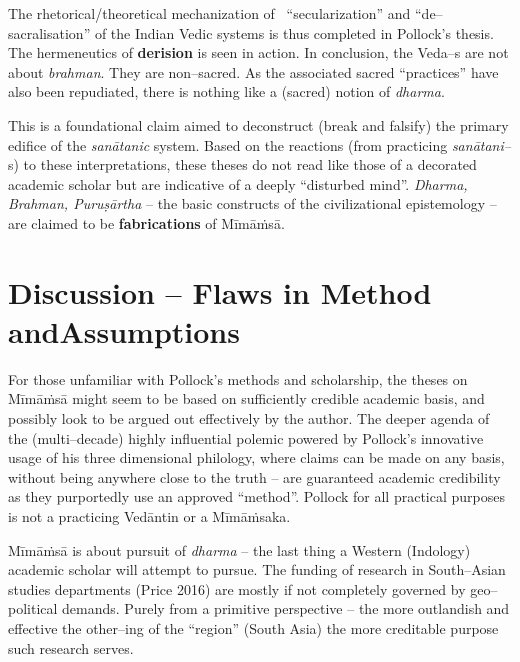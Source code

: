 The rhetorical/theoretical mechanization of  “secularization” and “de–sacralisation” of the Indian Vedic systems is thus completed in Pollock’s thesis. The hermeneutics of \textbf{derision} is seen in action. In conclusion, the Veda–s are not about \textit{brahman}. They are non–sacred. As the associated sacred “practices” have also been repudiated, there is nothing like a (sacred) notion of \textit{dharma}.

This is a foundational claim aimed to deconstruct (break and falsify) the primary edifice of the \textit{sanātanic} system. Based on the reactions (from practicing \textit{sanātani–}s) to these interpretations, these theses do not read like those of a decorated academic scholar but are indicative of a deeply “disturbed mind”. \textit{Dharma, Brahman, Puruṣārtha} – the basic constructs of the civilizational epistemology – are claimed to be \textbf{fabrications} of Mīmāṁsā.


\section*{Discussion – Flaws in Method and\hfill \break Assumptions}

\vskip -6pt

For those unfamiliar with Pollock’s methods and scholarship, the theses on Mīmāṁsā might seem to be based on sufficiently credible academic basis, and possibly look to be argued out effectively by the author. The deeper agenda of the (multi–decade) highly influential polemic powered by Pollock’s innovative usage of his three dimensional philology, where claims can be made on any basis, without being anywhere close to the truth – are guaranteed academic credibility as they purportedly use an approved “method”. Pollock for all practical purposes is not a practicing Vedāntin or a Mīmāṁsaka.

Mīmāṁsā is about pursuit of \textit{dharma} – the last thing a Western (Indology) academic scholar will attempt to pursue. The funding of research in South–Asian studies departments (Price 2016) are mostly if not completely governed by geo–political demands. Purely from a primitive perspective – the more outlandish and effective the other–ing of the “region” (South Asia) the more creditable purpose such research serves. 

